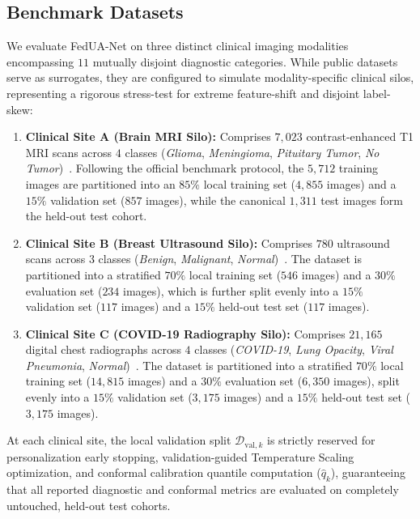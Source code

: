 \documentclass[journal]{IEEEtran}
\begin{document}
\subsection{Benchmark Datasets}
We evaluate FedUA-Net on three distinct clinical imaging modalities encompassing $11$ mutually disjoint diagnostic categories. While public datasets serve as surrogates, they are configured to simulate modality-specific clinical silos, representing a rigorous stress-test for extreme feature-shift and disjoint label-skew:
\begin{enumerate}
    \item \textbf{Clinical Site A (Brain MRI Silo):} Comprises $7{,}023$ contrast-enhanced T1 MRI scans across $4$ classes (\textit{Glioma}, \textit{Meningioma}, \textit{Pituitary Tumor}, \textit{No Tumor})~\cite{cheng2015enhanced}. Following the official benchmark protocol, the $5{,}712$ training images are partitioned into an $85\%$ local training set ($4{,}855$ images) and a $15\%$ validation set ($857$ images), while the canonical $1{,}311$ test images form the held-out test cohort.
    \item \textbf{Clinical Site B (Breast Ultrasound Silo):} Comprises $780$ ultrasound scans across $3$ classes (\textit{Benign}, \textit{Malignant}, \textit{Normal})~\cite{al2020dataset}. The dataset is partitioned into a stratified $70\%$ local training set ($546$ images) and a $30\%$ evaluation set ($234$ images), which is further split evenly into a $15\%$ validation set ($117$ images) and a $15\%$ held-out test set ($117$ images).
    \item \textbf{Clinical Site C (COVID-19 Radiography Silo):} Comprises $21{,}165$ digital chest radiographs across $4$ classes (\textit{COVID-19}, \textit{Lung Opacity}, \textit{Viral Pneumonia}, \textit{Normal})~\cite{chowdhury2020can}. The dataset is partitioned into a stratified $70\%$ local training set ($14{,}815$ images) and a $30\%$ evaluation set ($6{,}350$ images), split evenly into a $15\%$ validation set ($3{,}175$ images) and a $15\%$ held-out test set ($3{,}175$ images).
\end{enumerate}
At each clinical site, the local validation split $\mathcal{D}_{\text{val}, k}$ is strictly reserved for personalization early stopping, validation-guided Temperature Scaling optimization, and conformal calibration quantile computation ($\hat{q}_k$), guaranteeing that all reported diagnostic and conformal metrics are evaluated on completely untouched, held-out test cohorts.
\end{document}
